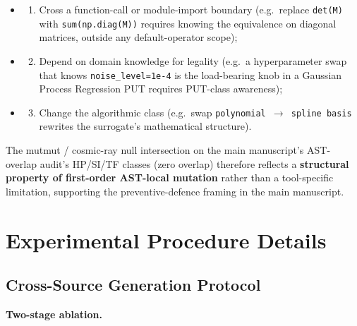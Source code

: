 \documentclass[review,12pt,authoryear]{elsarticle}
\providecommand{\tightlist}{\setlength{\itemsep}{0pt}\setlength{\parskip}{0pt}}
\begin{document}
\begin{itemize}
\tightlist
\item
  \begin{enumerate}
  \tightlist
  \item
    Cross a function-call or module-import boundary (e.g.~replace
    \texttt{det(M)} with \texttt{sum(np.diag(M))} requires knowing the
    equivalence on diagonal matrices, outside any default-operator
    scope);
  \end{enumerate}
\item
  \begin{enumerate}
  \setcounter{enumi}{1}
  \tightlist
  \item
    Depend on domain knowledge for legality (e.g.~a hyperparameter swap
    that knows \texttt{noise\_level=1e-4} is the load-bearing knob in a
    Gaussian Process Regression PUT requires PUT-class awareness);
  \end{enumerate}
\item
  \begin{enumerate}
  \setcounter{enumi}{2}
  \tightlist
  \item
    Change the algorithmic class (e.g.~swap
    \texttt{polynomial\ $\to$\ spline\ basis} rewrites the surrogate's
    mathematical structure).
  \end{enumerate}
\end{itemize}

The mutmut / cosmic-ray null intersection on the main manuscript's AST-overlap audit's HP/SI/TF classes
(zero overlap) therefore reflects a \textbf{structural property of
first-order AST-local mutation} rather than a tool-specific limitation,
supporting the preventive-defence framing in the main manuscript.


\section{Experimental Procedure Details}\label{c.-experimental-procedure-details}

\subsection{Cross-Source Generation Protocol}\label{c.1-cross-source-v4-protocol-full-specification}

\textbf{Two-stage ablation.}
\end{document}
